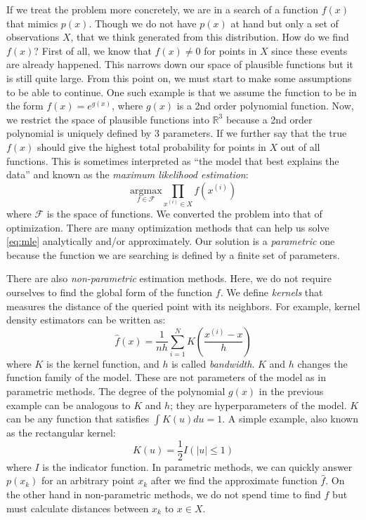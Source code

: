 \documentclass[a4paper,onesided,12pt]{report}
\begin{document}
If we treat the problem more concretely, we are in a search of a function $f(x)$ that mimics $p(x)$. Though we do not have $p(x)$ at hand but only a set of observations $X$, that we think generated from this distribution. How do we find $f(x)$? First of all, we know that $f(x) \neq 0$ for points in $X$ since these events are already happened. This narrows down our space of plausible functions but it is still quite large. From this point on, we must start to make some assumptions to be able to continue. One such example is that we assume the function to be in the form $f(x)=e^{g(x)}$, where $g(x)$ is a 2nd order polynomial function. Now, we restrict the space of plausible functions into $\mathbb{R}^3$ because a 2nd order polynomial is uniquely defined by 3 parameters. If we further say that the true $f(x)$ should give the highest total probability for points in $X$ out of all functions. This is sometimes interpreted as ``the model that best explains the data'' and known as the \emph{maximum likelihood estimation}:
\begin{equation}
\underset{f \in \mathcal{F}}{\text{argmax}} \prod_{x^{(i)} \in X} f(x^{(i)}) 
\label{eq:mle}
\end{equation}
where $\mathcal{F}$ is the space of functions. We converted the problem into that of optimization. There are many optimization methods that can help us solve \ref{eq:mle} analytically and/or approximately. Our solution is a \emph{parametric} one because the function we are searching is defined by a finite set of parameters.

There are also \emph{non-parametric} estimation methods. Here, we do not require ourselves to find the global form of the function $f$. We define \emph{kernels} that measures the distance of the queried point with its neighbors. For example, kernel density estimators can be written as:
\begin{equation}
\hat{f}(x) = \frac{1}{nh} \sum_{i=1}^N K\left(\frac{x^{(i)}-x}{h}\right)
\label{eq:kde}
\end{equation}
where $K$ is the kernel function, and $h$ is called \emph{bandwidth}. $K$ and $h$ changes the function family of the model. These are not parameters of the model as in parametric methods. The degree of the polynomial $g(x)$ in the previous example can be analogous to $K$ and $h$; they are hyperparameters of the model. $K$ can be any function that satisfies $\int K(u) du = 1$. A simple example, also known as the rectangular kernel:
\begin{equation}
K(u) = \frac{1}{2} I (|u| \leq 1)
\label{eq:rectangular_kernel}
\end{equation}
where $I$ is the indicator function. In parametric methods, we can quickly answer $p(x_k)$ for an arbitrary point $x_k$ after we find the approximate function $\hat{f}$. On the other hand in non-parametric methods, we do not spend time to find $\hat{f}$ but must calculate distances between $x_k$ to $x \in X$.
\end{document}
